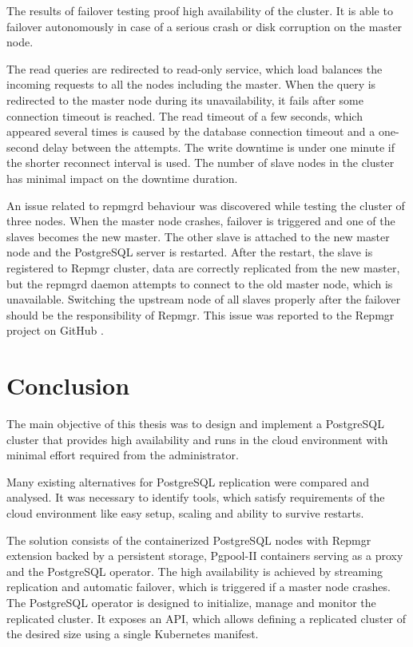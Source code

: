 \documentclass[
  digital, %
  twoside, %
  table,   %
  nolof,   %
  nolot,   %
]{fithesis3}
\begin{document}
The results of failover testing proof high availability of the cluster. It is able to failover autonomously in case of a serious crash or disk corruption on the master node.

The read queries are redirected to read-only service, which load balances the incoming requests to all the nodes including the master. When the query is redirected to the master node during its unavailability, it fails after some connection timeout is reached.
The read timeout of a few seconds, which appeared several times is caused by the database connection timeout and a one-second delay between the attempts. The write downtime is under one minute if the shorter reconnect interval is used. The number of slave nodes in the cluster has minimal impact on the downtime duration.

An issue related to repmgrd behaviour was discovered while testing the cluster of three nodes. When the master node crashes, failover is triggered and one of the slaves becomes the new master. The other slave is attached to the new master node and the PostgreSQL server is restarted. After the restart, the slave is registered to Repmgr cluster, data are correctly replicated from the new master, but the repmgrd daemon attempts to connect to the old master node, which is unavailable. Switching the upstream node of all slaves properly after the failover should be the responsibility of Repmgr. This issue was reported to the Repmgr project on GitHub \cite{repmgrd_issue}.


\chapter{Conclusion} \label{chap:conclusion}
The main objective of this thesis was to design and implement a PostgreSQL cluster that provides high availability and runs in the cloud environment with minimal effort required from the administrator.

Many existing alternatives for PostgreSQL replication were compared and analysed. It was necessary to identify tools, which satisfy requirements of the cloud environment like easy setup, scaling and ability to survive restarts.

The solution consists of the containerized PostgreSQL nodes with Repmgr extension backed by a persistent storage, Pgpool-II containers serving as a proxy and the PostgreSQL operator. The high availability is achieved by streaming replication and automatic failover, which is triggered if a master node crashes. The PostgreSQL operator is designed to initialize, manage and monitor the replicated cluster. It exposes an API, which allows defining a replicated cluster of the desired size using a single Kubernetes manifest.
\end{document}
